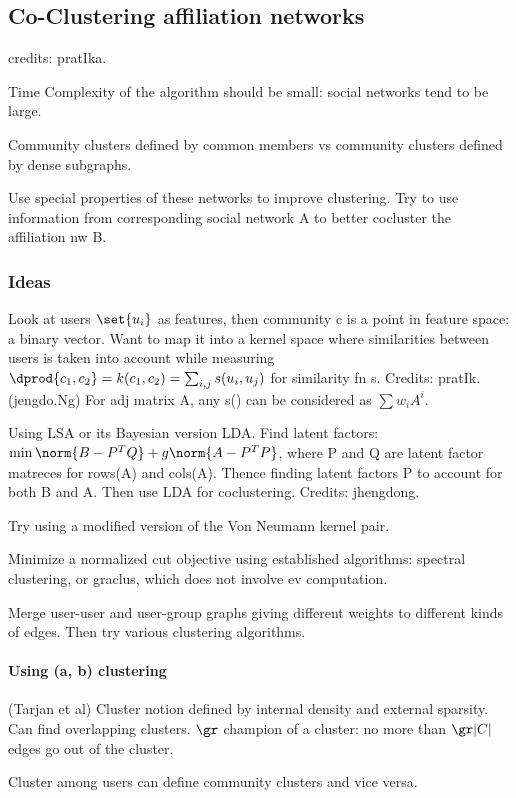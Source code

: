\documentclass{article}
\begin{document}
\subsection{Co-Clustering affiliation networks}
credits: pratIka.

Time Complexity of the algorithm should be small: social networks tend to be large.

Community clusters defined by common members vs community clusters defined by dense subgraphs.

Use special properties of these networks to improve clustering. Try to use information from corresponding social network A to better cocluster the affiliation nw B.

\subsubsection{Ideas}
Look at users $\set{u_{i}}$ as features, then community c is a point in feature space: a binary vector. Want to map it into a kernel space where similarities between users is taken into account while measuring $\dprod{c_{1}, c_{2}} = k(c_{1}, c_{2}) = \sum_{i,j} s(u_{i}, u_{j})$ for similarity fn s.
\subitem Credits: pratIk.
\subitem (jengdo.Ng) For adj matrix A, any s() can be considered as $\sum w_{i}A^{i}$.

Using LSA or its Bayesian version LDA.
\subitem Find latent factors: $\min \norm{B-P^{T}Q} + g\norm{A-P^{T}P}$, where P and Q are latent factor matreces for rows(A) and cols(A). Thence finding latent factors P to account for both B and A. Then use LDA for coclustering.
\subitem Credits: jhengdong.

Try using a modified version of the Von Neumann kernel pair.

Minimize a normalized cut objective using established algorithms: spectral clustering, or graclus, which does not involve ev computation.

Merge user-user and user-group graphs giving different weights to different kinds of edges. Then try various clustering algorithms.

\paragraph*{Using (a, b) clustering}
(Tarjan et al) Cluster notion defined by internal density and external sparsity. Can find overlapping clusters. $\gr$ champion of a cluster: no more than $\gr |C|$ edges go out of the cluster.

Cluster among users can define community clusters and vice versa.
\end{document}
